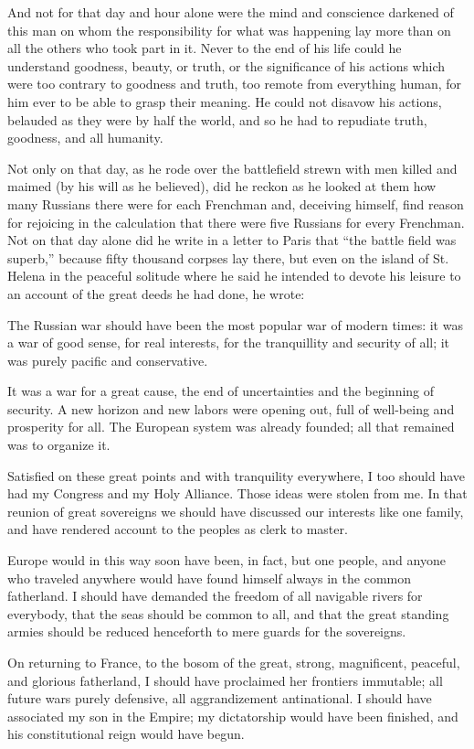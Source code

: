And not for that day and hour alone were the mind and conscience
darkened of this man on whom the responsibility for what was
happening lay more than on all the others who took part in
it. Never to the end of his life could he understand goodness,
beauty, or truth, or the significance of his actions which were
too contrary to goodness and truth, too remote from everything
human, for him ever to be able to grasp their meaning. He could
not disavow his actions, belauded as they were by half the world,
and so he had to repudiate truth, goodness, and all humanity.

Not only on that day, as he rode over the battlefield strewn with
men killed and maimed (by his will as he believed), did he reckon
as he looked at them how many Russians there were for each
Frenchman and, deceiving himself, find reason for rejoicing in
the calculation that there were five Russians for every
Frenchman. Not on that day alone did he write in a letter to
Paris that ``the battle field was superb,'' because fifty
thousand corpses lay there, but even on the island of St.  Helena
in the peaceful solitude where he said he intended to devote his
leisure to an account of the great deeds he had done, he wrote:

The Russian war should have been the most popular war of modern
times: it was a war of good sense, for real interests, for the
tranquillity and security of all; it was purely pacific and
conservative.

It was a war for a great cause, the end of uncertainties and the
beginning of security. A new horizon and new labors were opening
out, full of well-being and prosperity for all. The European
system was already founded; all that remained was to organize it.

Satisfied on these great points and with tranquility everywhere,
I too should have had my Congress and my Holy Alliance. Those
ideas were stolen from me. In that reunion of great sovereigns we
should have discussed our interests like one family, and have
rendered account to the peoples as clerk to master.

Europe would in this way soon have been, in fact, but one people,
and anyone who traveled anywhere would have found himself always
in the common fatherland. I should have demanded the freedom of
all navigable rivers for everybody, that the seas should be
common to all, and that the great standing armies should be
reduced henceforth to mere guards for the sovereigns.

On returning to France, to the bosom of the great, strong,
magnificent, peaceful, and glorious fatherland, I should have
proclaimed her frontiers immutable; all future wars purely
defensive, all aggrandizement antinational. I should have
associated my son in the Empire; my dictatorship would have been
finished, and his constitutional reign would have begun.

